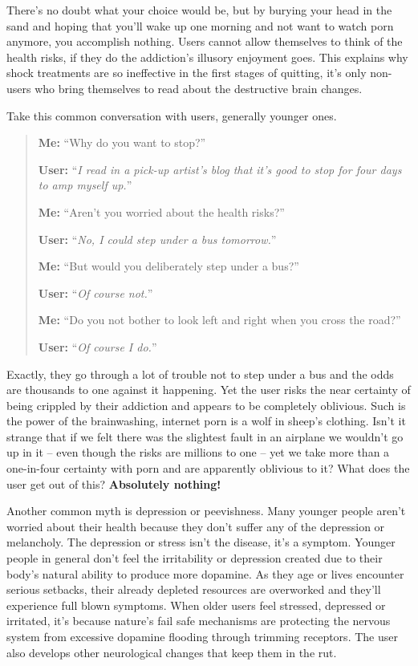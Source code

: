\documentclass[
]{book}
\begin{document}
There's no doubt what your choice would be, but by burying your head in the sand and hoping that you'll wake up one morning and not want to watch porn anymore, you accomplish nothing. Users cannot allow themselves to think of the health risks, if they do the addiction's illusory enjoyment goes. This explains why shock treatments are so ineffective in the first stages of quitting, it's only non-users who bring themselves to read about the destructive brain changes.

Take this common conversation with users, generally younger ones.

\begin{quote}
\textbf{Me:} ``Why do you want to stop?''

\textbf{User:} ``\emph{I read in a pick-up artist's blog that it's good to stop for four days to amp myself up.}''

\textbf{Me:} ``Aren't you worried about the health risks?''

\textbf{User:} ``\emph{No, I could step under a bus tomorrow.}''

\textbf{Me:} ``But would you deliberately step under a bus?''

\textbf{User:} ``\emph{Of course not.}''

\textbf{Me:} ``Do you not bother to look left and right when you cross the road?''

\textbf{User:} ``\emph{Of course I do.}''
\end{quote}

Exactly, they go through a lot of trouble not to step under a bus and the odds are thousands to one against it happening. Yet the user risks the near certainty of being crippled by their addiction and appears to be completely oblivious. Such is the power of the brainwashing, internet porn is a wolf in sheep's clothing. Isn't it strange that if we felt there was the slightest fault in an airplane we wouldn't go up in it -- even though the risks are millions to one -- yet we take more than a one-in-four certainty with porn and are apparently oblivious to it? What does the user get out of this? \textbf{Absolutely nothing!}

Another common myth is depression or peevishness. Many younger people aren't worried about their health because they don't suffer any of the depression or melancholy. The depression or stress isn't the disease, it's a symptom. Younger people in general don't feel the irritability or depression created due to their body's natural ability to produce more dopamine. As they age or lives encounter serious setbacks, their already depleted resources are overworked and they'll experience full blown symptoms. When older users feel stressed, depressed or irritated, it's because nature's fail safe mechanisms are protecting the nervous system from excessive dopamine flooding through trimming receptors. The user also develops other neurological changes that keep them in the rut.
\end{document}
